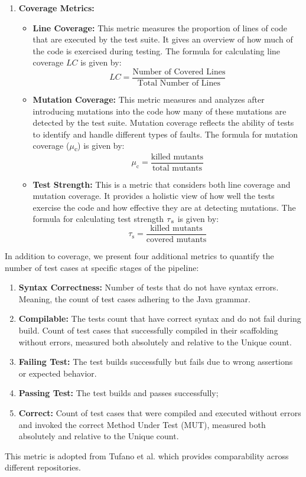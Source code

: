     \begin{enumerate}
        \item \textbf{Coverage Metrics:}
        \begin{itemize}
            \item \textbf{Line Coverage:} This metric measures the proportion of lines of code that are executed by the test suite. It gives an overview of how much of the code is exercised during testing. The formula for calculating line coverage \(LC\) is given by:
\[
LC = \frac{\text{{Number of Covered Lines}}}{\text{{Total Number of Lines}}}
\]

            \item \textbf{Mutation Coverage:} This metric measures and analyzes after introducing mutations into the code how many of these mutations are detected by the test suite. Mutation coverage reflects the ability of tests to identify and handle different types of faults.
            The formula for mutation coverage ($\mu$\textsubscript{c}) is given by:
\[
\mu_{\text{c}} = \frac{\text{{killed mutants}}}{\text{{total mutants}}}
\]
            \item \textbf{Test Strength:} This is a metric that considers both line coverage and mutation coverage. It provides a holistic view of how well the tests exercise the code and how effective they are at detecting mutations. The formula for calculating test strength \(\tau\textsubscript{s}\) is given by:
\[
\tau_{\text{s}} = \frac{\text{{killed mutants}}}{\text{{covered mutants}}}
\]
        \end{itemize}
    \end{enumerate}

    In addition to coverage, we present four additional metrics to quantify the number of test cases at specific stages of the pipeline:

    \begin{enumerate}
        \item \textbf{Syntax Correctness:} Number of tests that do not have syntax errors. Meaning, the count of test cases adhering to the Java grammar.
        \item \textbf{Compilable:} The tests count that have correct syntax and do not fail during build. Count of test cases that successfully compiled in their scaffolding without errors, measured both absolutely and relative to the Unique count.
        \item \textbf{Failing Test:} The test builds successfully but fails due to wrong assertions or expected behavior.
        \item \textbf{Passing Test:} The test builds and passes successfully;
        \item \textbf{Correct:} Count of test cases that were compiled and executed without errors and invoked the correct Method Under Test (MUT), measured both absolutely and relative to the Unique count. 
    \end{enumerate}
    This metric is adopted from Tufano et al. \cite{tufano_unit_2021} which provides comparability across different repositories.

